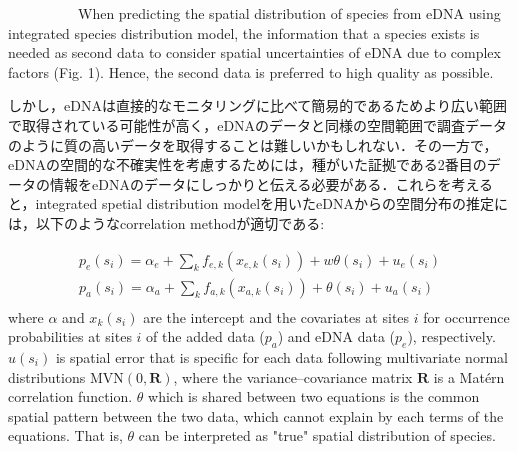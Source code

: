 \documentclass[12pt]{article}
\begin{document}
\begin{linenumbers}
\ \ \ \ \ \ \ \ \ \ 
When predicting the spatial distribution of species from eDNA using integrated species distribution model, the information that a species exists is needed as second data to consider spatial uncertainties of eDNA due to complex factors (Fig. 1). Hence, the second data is preferred to high quality as possible. 

しかし，eDNAは直接的なモニタリングに比べて簡易的であるためより広い範囲で取得されている可能性が高く，eDNAのデータと同様の空間範囲で調査データのように質の高いデータを取得することは難しいかもしれない．その一方で，eDNAの空間的な不確実性を考慮するためには，種がいた証拠である2番目のデータの情報をeDNAのデータにしっかりと伝える必要がある．これらを考えると，integrated spetial distribution modelを用いたeDNAからの空間分布の推定には，以下のようなcorrelation methodが適切である: 

\begin{equation}
\begin{array}{ll}
p_{e}(s_{i}) = \alpha_{e} + \sum_{k}f_{e, k}(x_{e, k}(s_{i})) + w \theta(s_{i}) + u_{e}(s_{i})\\
p_{a}(s_{i}) = \alpha_{a} + \sum_{k}f_{a, k}(x_{a, k}(s_{i})) + \theta(s_{i}) + u_{a}(s_{i})\\
\end{array}
\end{equation}
where $\alpha$ and $x_{k}(s_{i})$ are the intercept and the covariates at sites $i$ for occurrence probabilities at sites $i$ of the added data ($p_{a}$) and eDNA data ($p_{e}$), respectively. $u(s_{i})$ is spatial error that is specific for each data following multivariate normal distributions $\mathrm{MVN}(0, \mathbf{R})$, where the variance--covariance matrix $\mathbf{R}$ is a Mat\'{e}rn correlation function. $\theta$ which is shared between two equations is the common spatial pattern between the two data, which cannot explain by each terms of the equations. That is, $\theta$ can be interpreted as "true" spatial distribution of species.






\end{linenumbers}
\end{document}
